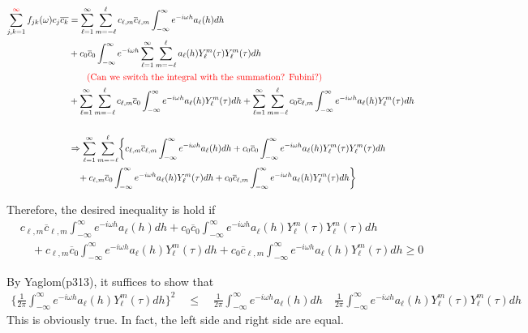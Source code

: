 \documentclass[11pt]{article}
\begin{document}
\begin{itemize}
\begin{align*}
\sum_{j,k=1}^{{\color{red}\infty}} f_{jk}(\omega) c_j \overline{c_k} &= \sum_{\ell=1}^\infty \sum_{m=-\ell}^{\ell} c_{\ell,m} \overline{c}_{\ell,m} \int_{-\infty}^{\infty} e^{-i \omega h}a_\ell(h) dh\\ 
&+ c_{0} \overline{c}_{0} \int_{-\infty}^{\infty} e^{-i \omega h} \sum_{\ell=1}^\infty \sum_{m=-\ell}^{\ell} a_\ell(h) Y_{\ell}^m(\tau) Y_{\ell}^m(\tau) dh\\ 
&\quad \quad \text{{\color{red}(Can we switch the integral with the summation? Fubini?)}}\\
&+ \sum_{\ell=1}^\infty \sum_{m=-\ell}^{\ell} c_{\ell,m} \overline{c}_{0} \int_{-\infty}^{\infty} e^{-i \omega h}a_\ell(h) Y_{\ell}^m(\tau) dh + \sum_{\ell=1}^\infty \sum_{m=-\ell}^{\ell} c_{0} \overline{c}_{\ell,m} \int_{-\infty}^{\infty} e^{-i \omega h}a_\ell(h) Y_{\ell}^m(\tau) dh\\
\\
&\Rightarrow \sum_{\ell=1}^\infty \sum_{m=-\ell}^{\ell} \biggl\{ c_{\ell,m} \overline{c}_{\ell,m} \int_{-\infty}^{\infty} e^{-i \omega h}a_\ell(h) dh + c_{0} \overline{c}_{0} \int_{-\infty}^{\infty} e^{-i \omega h} a_\ell(h) Y_{\ell}^m(\tau) Y_{\ell}^m(\tau) dh\\
&\quad + c_{\ell,m} \overline{c}_{0} \int_{-\infty}^{\infty} e^{-i \omega h}a_\ell(h) Y_{\ell}^m(\tau) dh + c_{0} \overline{c}_{\ell,m} \int_{-\infty}^{\infty} e^{-i \omega h}a_\ell(h) Y_{\ell}^m(\tau) dh \biggl\}\\
\end{align*}

Therefore, the desired inequality is hold if\\
\begin{align*}
&c_{\ell,m} \overline{c}_{\ell,m} \int_{-\infty}^{\infty} e^{-i \omega h}a_\ell(h) dh + c_{0} \overline{c}_{0} \int_{-\infty}^{\infty} e^{-i \omega h} a_\ell(h) Y_{\ell}^m(\tau) Y_{\ell}^m(\tau) dh\\
&\quad + c_{\ell,m} \overline{c}_{0} \int_{-\infty}^{\infty} e^{-i \omega h}a_\ell(h) Y_{\ell}^m(\tau) dh + c_{0} \overline{c}_{\ell,m} \int_{-\infty}^{\infty} e^{-i \omega h}a_\ell(h) Y_{\ell}^m(\tau) dh \ge 0
\end{align*}

By Yaglom(p313), it suffices to show that\\
\begin{align*}
\biggl\{ \frac{1}{2\pi} \int_{-\infty}^{\infty} e^{-i \omega h}a_\ell(h) Y_{\ell}^m(\tau) dh \biggl\}^2 \quad \le \quad \frac{1}{2\pi} \int_{-\infty}^{\infty} e^{-i \omega h}a_\ell(h) dh \quad \frac{1}{2\pi} \int_{-\infty}^{\infty} e^{-i \omega h}a_\ell(h) Y_{\ell}^m(\tau) Y_{\ell}^m(\tau) dh 
\end{align*}
This is obviously true. In fact, the left side and right side are equal.\\


\end{itemize}
\end{document}
